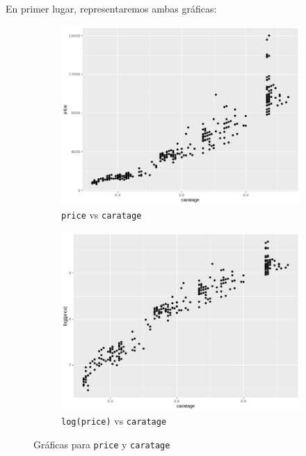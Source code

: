 \documentclass[a4paper, 9pt]{article}
\begin{document}
En primer lugar, representaremos ambas gráficas:

\begin{figure}[h!]
  \centering
  \begin{subfigure}[b]{0.35\linewidth}
    \includegraphics[width=\linewidth]{report/images/question-1/price.png}
    \caption{\texttt{price} vs \texttt{caratage}}
  \end{subfigure}
  \begin{subfigure}[b]{0.35\linewidth}
    \includegraphics[width=\linewidth]{report/images/question-1/logprice.png}
    \caption{\texttt{log(price)} vs \texttt{caratage}}
  \end{subfigure}
  \caption{Gráficas para \texttt{price} y \texttt{caratage}}
  \label{fig:coffee}
\end{figure}
\end{document}
